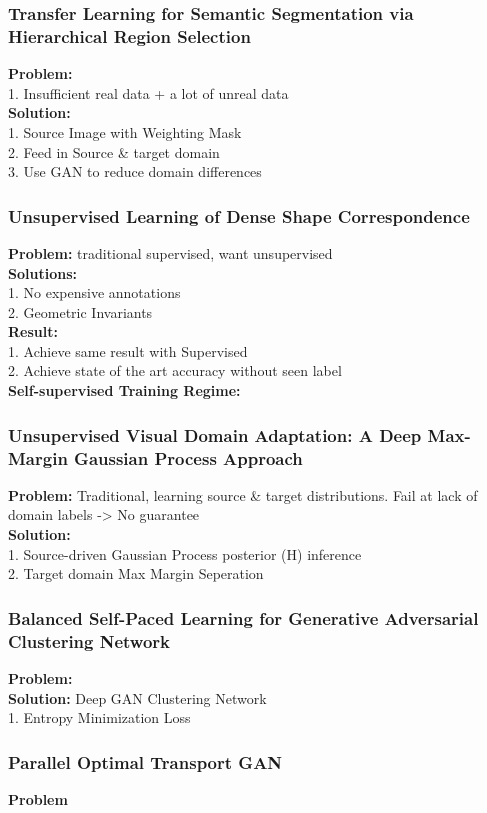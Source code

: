 \subsubsection{Transfer Learning for Semantic Segmentation via Hierarchical Region Selection}
    {\bf Problem:} \\
        1. Insufficient real data + a lot of unreal data \\
    {\bf Solution:} \\
        1. Source Image with Weighting Mask \\
        2. Feed in Source \& target domain \\
        3. Use GAN to reduce domain differences \\
\subsubsection{Unsupervised Learning of Dense Shape Correspondence}
    {\bf Problem:} traditional supervised, want unsupervised \\
    {\bf Solutions:} \\
        1. No expensive annotations \\
        2. Geometric Invariants \\
    {\bf Result:} \\
        1. Achieve same result with Supervised \\
        2. Achieve state of the art accuracy without seen label \\
    {\bf Self-supervised Training Regime:} \\
\subsubsection{Unsupervised Visual Domain Adaptation: A Deep Max-Margin Gaussian Process Approach}
    {\bf Problem:} Traditional, learning source \& target distributions. Fail at lack of domain labels -> No guarantee \\
    {\bf Solution:} \\
        1. Source-driven Gaussian Process posterior (H) inference \\
        2. Target domain Max Margin Seperation \\
\subsubsection{Balanced Self-Paced Learning for Generative Adversarial Clustering Network}
    {\bf Problem:}  \\
    {\bf Solution:} Deep GAN Clustering Network \\
        1. Entropy Minimization Loss \\
\subsubsection{Parallel Optimal Transport GAN}
    {\bf Problem}
